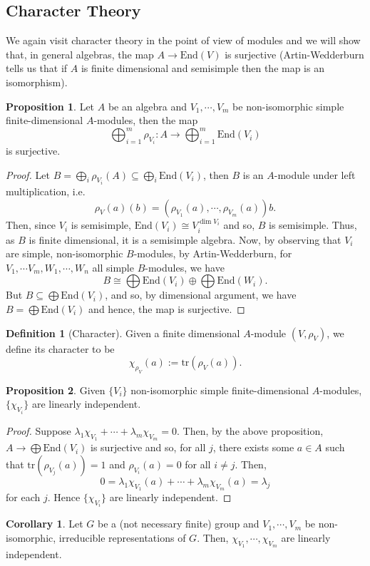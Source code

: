 \documentclass[]{article}
\theoremstyle{definition}
\newtheorem{corollary}{Corollary}[theorem]
\theoremstyle{definition}
\newtheorem{definition}{Definition}[section]
\newtheorem{proposition}{Proposition}[section]
\begin{document}
\subsection{Character Theory}

We again visit character theory in the point of view of modules and we will 
show that, in general algebras, the map \(A \to \text{End}(V)\) is surjective 
(Artin-Wedderburn tells us that if \(A\) is finite dimensional and semisimple 
then the map is an isomorphism).

\begin{proposition}
  Let \(A\) be an algebra and \(V_1, \cdots, V_m\) be non-isomorphic simple 
  finite-dimensional \(A\)-modules, then the map
  \[\bigoplus_{i = 1}^m \rho_{V_i} : A \to \bigoplus_{i = 1}^m \text{End}(V_i)\] 
  is surjective.
\end{proposition}
\begin{proof}
  Let \(B = \bigoplus_i \rho_{V_i}(A) \subseteq \bigoplus_i \text{End}(V_i)\), 
  then \(B\) is an \(A\)-module under left multiplication, i.e.
  \[\rho_V(a)(b) = (\rho_{V_1}(a), \cdots, \rho_{V_m}(a))b.\]
  Then, since \(V_i\) is semisimple, \(\text{End}(V_i) \cong V_i^{\dim V_i}\) 
  and so, \(B\) is semisimple. Thus, as \(B\) is finite dimensional, it 
  is a semisimple algebra. Now, by observing that \(V_i\) are simple, non-isomorphic 
  \(B\)-modules, by Artin-Wedderburn, for \(V_1, \cdots V_m, W_1, \cdots, W_n\)
  all simple \(B\)-modules, we have 
  \[B \cong \bigoplus \text{End}(V_i) \oplus \bigoplus \text{End}(W_i).\]
  But \(B \subseteq \bigoplus \text{End}(V_i)\), and so, by dimensional 
  argument, we have \(B = \bigoplus \text{End}(V_i)\) and hence, the map is 
  surjective.
\end{proof}

\begin{definition}[Character]
  Given a finite dimensional \(A\)-module \((V, \rho_V)\), we define its 
  character to be 
  \[\chi_{\rho_V}(a) := \text{tr}(\rho_V(a)).\]
\end{definition}

\begin{proposition}
  Given \(\{V_i\}\) non-isomorphic simple finite-dimensional \(A\)-modules,
  \(\{\chi_{V_i}\}\) are linearly independent.
\end{proposition}
\begin{proof}
  Suppose \(\lambda_1 \chi_{V_1} + \cdots + \lambda_m \chi_{V_m} = 0\). Then, 
  by the above proposition, \(A \to \bigoplus \text{End}(V_i)\) is surjective and 
  so, for all \(j\), there exists some \(a \in A\) such that 
  \(\text{tr}(\rho_{V_j}(a)) = 1\) and \(\rho_{V_i}(a) = 0\) for all \(i \neq j\).
  Then, 
  \[0 = \lambda_1 \chi_{V_1}(a) + \cdots + \lambda_m \chi_{V_m}(a) = \lambda_j\]
  for each \(j\). Hence \(\{\chi_{V_i}\}\) are linearly independent.
\end{proof}

\begin{corollary}
  Let \(G\) be a (not necessary finite) group and \(V_1, \cdots, V_m\) be 
  non-isomorphic, irreducible representations of \(G\). Then, 
  \(\chi_{V_1}, \cdots, \chi_{V_m}\) are linearly independent.
\end{corollary}
\end{document}

